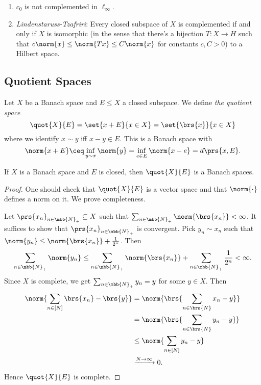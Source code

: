 \documentclass[10pt, twoside]{book}
\begin{document}
\begin{fact}
\begin{enumerate}
\item $c_0$ is not complemented in $\ell_\infty$.
\item \emph{Lindenstaruss-Tzafriri}: Every closed subspace of $X$ is complemented if and only if $X$ is isomorphic (in the sense that there's a bijection $T \colon X \to H$ such that $c\norm{x} \leq \norm{Tx} \leq C\norm{x}$ for constants $c,C > 0$) to a Hilbert space.
\end{enumerate}
\end{fact}

\subsection{Quotient Spaces}

\begin{definition}
Let $X$ be a Banach space and $E \leq X$ a closed subspace. We define \emph{the quotient space}
\[\quot{X}{E} = \set{x + E}{x \in X} = \set{\brs{x}}{x \in X}\]
where we identify $x \sim y$ iff $x-y \in E$.
This is a Banach space with
\[\norm{x + E} \ceq \inf_{y \sim x} \norm{y} = \inf_{e \in E} \norm{x-e} = d\prs{x,E} \text{.}\]
\end{definition}

\begin{fact}
If $X$ is a Banach space and $E$ is closed, then $\quot{X}{E}$ is a Banach spaces.
\end{fact}

\begin{proof}
One should check that $\quot{X}{E}$ is a vector space and that $\norm{\cdot}$ defines a norm on it. We prove completeness.

Let $\prs{x_n}_{n \in \mbb{N}_+} \subseteq X$ such that $\sum_{n \in \mbb{N}_+} \norm{\brs{x_n}} < \infty$. It suffices to show that $\prs{x_n}_{n \in \mbb{N}_+}$ is convergent. Pick $y_n \sim x_n$ such that $\norm{y_n} \leq \norm{\brs{x_n}} + \frac{1}{2^n}$.
Then
\[\sum_{n \in \mbb{N}_+} \norm{y_n} \leq \sum_{n \in \mbb{N}_+} \norm{\brs{x_n}} + \sum_{n \in \mbb{N}_+} \frac{1}{2^n} < \infty \text{.}\]
Since $X$ is complete, we get $\sum_{n \in \mbb{N}_+} y_n = y$ for some $y \in X$. Then
\begin{align*}
\norm{\sum_{n \in [N]} \brs{x_n} - \brs{y}} &= \norm{\brs{\sum_{n \in \brs{N}} x_n - y}}
\\&= \norm{\brs{\sum_{n \in \brs{N}} y_n - y}}
\\&\leq \norm{\sum_{n \in [N]} y_n - y}
\\&\xrightarrow{N\to\infty} 0 \text{.}
\end{align*}
Hence $\quot{X}{E}$ is complete.
\end{proof}
\end{document}
